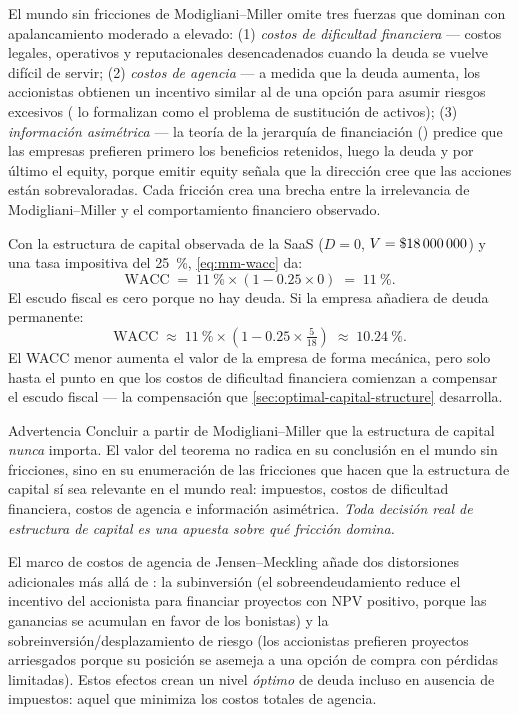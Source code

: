 El mundo sin fricciones de Modigliani–Miller omite tres fuerzas que dominan con apalancamiento
moderado a elevado:
(1) \emph{costos de dificultad financiera} --- costos legales, operativos y reputacionales
desencadenados cuando la deuda se vuelve difícil de servir; (2) \emph{costos de agencia} --- a medida
que la deuda aumenta, los accionistas obtienen un incentivo similar al de una opción para asumir riesgos
excesivos (\textcite{jensen1976agency} lo formalizan como el problema de sustitución de activos);
(3) \emph{información asimétrica} --- la teoría de la jerarquía de financiación
(\textcite{brealey2020}) predice que las empresas prefieren primero los beneficios retenidos, luego la
deuda y por último el equity, porque emitir equity señala que la dirección cree que las acciones
están sobrevaloradas. Cada fricción crea una brecha entre la irrelevancia de Modigliani–Miller y el
comportamiento financiero observado.

\begin{example}
Con la estructura de capital observada de la SaaS (\(D=0\), \(V=\$\num{18000000}\)) y una
tasa impositiva del \qty{25}{\percent}, \cref{eq:mm-wacc} da:
\[
  \mathrm{WACC} \;=\; \qty{11}{\percent}\times(1-0.25\times0) \;=\; \qty{11}{\percent}.
\]
El escudo fiscal es cero porque no hay deuda. Si la empresa añadiera
 de deuda permanente:
\[
  \mathrm{WACC} \;\approx\; \qty{11}{\percent}\times\!\left(1-0.25\times\tfrac{5}{18}\right)
               \;\approx\; \qty{10.24}{\percent}.
\]
El WACC menor aumenta el valor de la empresa de forma mecánica, pero solo hasta el punto en que
los costos de dificultad financiera comienzan a compensar el escudo fiscal --- la compensación que
\cref{sec:optimal-capital-structure} desarrolla.
\end{example}

\begin{admonition}{Advertencia}
Concluir a partir de Modigliani–Miller que la estructura de capital \emph{nunca} importa. El valor
del teorema no radica en su conclusión en el mundo sin fricciones, sino en su enumeración de las
fricciones que hacen que la estructura de capital sí sea relevante en el mundo real: impuestos,
costos de dificultad financiera, costos de agencia e información asimétrica. \emph{Toda decisión
real de estructura de capital es una apuesta sobre qué fricción domina.}
\end{admonition}

El marco de costos de agencia de Jensen--Meckling añade dos distorsiones adicionales más allá de
\textcite{modigliani1958capital}: la subinversión (el sobreendeudamiento reduce el incentivo del
accionista para financiar proyectos con NPV positivo, porque las ganancias se acumulan en favor de los
bonistas) y la sobreinversión/desplazamiento de riesgo (los accionistas prefieren proyectos arriesgados
porque su posición se asemeja a una opción de compra con pérdidas limitadas). Estos efectos crean un
nivel \emph{óptimo} de deuda incluso en ausencia de impuestos: aquel que minimiza los costos totales
de agencia.

